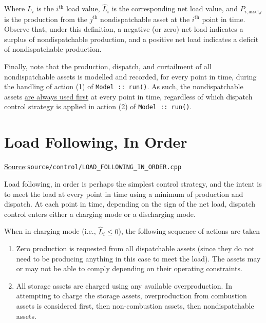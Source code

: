\documentclass[12pt, letterpaper]{report}
\begin{document}
\noindent Where $L_i$ is the $i^\textrm{th}$ load value, $\widehat{L}_i$ is the corresponding net load value, and $P_{i,\textrm{asset} j}$ is the production from the $j^\textrm{th}$ nondispatchable asset at the $i^\textrm{th}$ point in time. Observe that, under this definition, a negative (or zero) net load indicates a surplus of nondispatchable production, and a positive net load indicates a deficit of nondispatchable production.\par 
Finally, note that the production, dispatch, and curtailment of all nondispatchable assets is modelled and recorded, for every point in time, during the handling of action (1) of \texttt{Model :: run()}. As such, the nondispatchable assets \underline{are always used first} at every point in time, regardless of which dispatch control strategy is applied in action (2) of \texttt{Model :: run()}.

\section{Load Following, In Order}

\begin{large}
\noindent\underline{Source}:\quad\texttt{source/control/LOAD\_FOLLOWING\_IN\_ORDER.cpp}\par
\end{large}
\vspace{5mm}

Load following, in order is perhaps the simplest control strategy, and the intent is to meet the load at every point in time using a minimum of production and dispatch. At each point in time, depending on the sign of the net load, dispatch control enters either a charging mode or a discharging mode.\par 
When in charging mode (i.e., $\widehat{L}_i \leq 0$), the following sequence of actions are taken

\begin{enumerate}
    \item Zero production is requested from all dispatchable assets (since they do not need to be producing anything in this case to meet the load). The assets may or may not be able to comply depending on their operating constraints.
    \item All storage assets are charged using any available overproduction. In attempting to charge the storage assets, overproduction from combustion assets is considered first, then non-combustion assets, then nondispatchable assets.
\end{enumerate}
\end{document}
